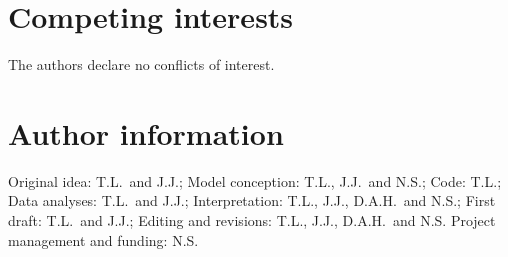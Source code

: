 \documentclass{article}
\begin{document}
    \section*{Competing interests}
    The authors declare no conflicts of interest.

    \section*{Author information}
    Original idea: T.L.\ and J.J.;
    Model conception: T.L., J.J.\ and N.S.;
    Code: T.L.;
    Data analyses: T.L.\ and J.J.;
    Interpretation: T.L., J.J., D.A.H.\ and N.S.;
    First draft: T.L.\ and J.J.;
    Editing and revisions: T.L., J.J., D.A.H.\ and N.S.
    Project management and funding: N.S\@.

    \printbibliography
    \newpage
\end{document}
